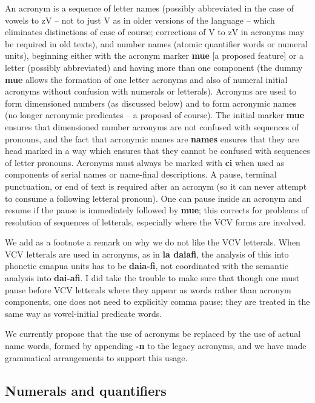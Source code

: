 \documentclass[12pt]{book}
\begin{document}
An acronym is a sequence of letter names (possibly abbreviated
in the case of vowels to zV -- not to just V as in older versions of the language -- which eliminates distinctions of case of course; corrections of V to zV in acronyms may be required in old texts), and number names (atomic quantifier words or numeral units), beginning either with the acronym marker {\bf mue} [a proposed feature] or a letter (possibly abbreviated)
and having more than one component (the dummy {\bf mue} allows the formation of one letter acronyms
and also of numeral initial acronyms without confusion with numerals or letterals).   Acronyms are used
to form dimensioned numbers (as discussed below) and to form acronymic names (no longer acronymic predicates -- a proposal of course).  The initial marker {\bf mue} ensures that dimensioned number acronyms are not confused with sequences of pronouns, and the fact that
acronymic names are {\bf names} ensures that they are head marked in a way which ensures that they cannot be confused with sequences of letter pronouns.  Acronyms must always be marked with {\bf ci} when used as components of serial names or name-final descriptions.  A pause, terminal punctuation, or end of text is required after an acronym (so it can never attempt to consume a following letteral pronoun).   One can pause inside an acronym and resume if the pause is immediately followed by {\bf mue}; this corrects for problems of resolution of sequences of letterals, especially where the VCV forms are involved.

We add as a footnote a remark on why we do not like the VCV letterals.  When  VCV letterals are used in acronyms, as in {\bf la daiafi}, the analysis of this into phonetic cmapua units has  to be {\bf daia-fi}, not coordinated with the semantic analysis into {\bf dai-afi}.   I did take the trouble to make sure
that though one must pause before VCV letterals where they appear as words rather than acronym components, one does not need to explicitly comma pause; they are treated in the same way as vowel-initial predicate words.

We currently propose that the use of acronyms be replaced by the use of actual name words, formed by appending {\bf -n} to the legacy acronyms, and we have made grammatical arrangements to support this usage.

\subsection{Numerals and quantifiers}
\end{document}
